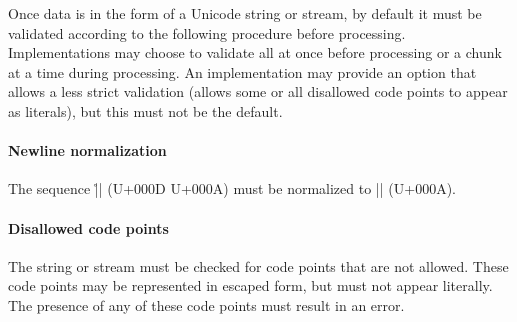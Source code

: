 \documentclass[11pt]{article}
\begin{document}
Once data is in the form of a Unicode string or stream, by default it must be validated according to the following procedure before processing.  Implementations may choose to validate all at once before processing or a chunk at a time during processing.  An implementation may provide an option that allows a less strict validation (allows some or all disallowed code points to appear as literals), but this must not be the default.

\paragraph{Newline normalization}  The sequence |\r\n| (U+000D U+000A) must be normalized to |\n| (U+000A).  

\paragraph{Disallowed code points}  The string or stream must be checked for code points that are not allowed.  These code points may be represented in escaped form, but must not appear literally.  The presence of any of these code points must result in an error.
\end{document}
